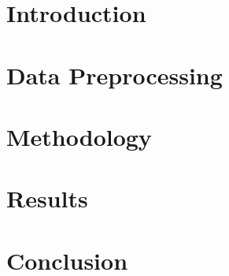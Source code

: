 \documentclass[NOTE, disdraft=false, UKenglish]{\DISCDTLATEXPATH UCLCDTDISdoc}
\begin{document}
\maketitle

\tableofcontents

\clearpage

\newpage
\section{Introduction}
\label{sec:introduction}


\section{Data Preprocessing}
\label{sec:data}


\section{Methodology}
\label{sec:methodology}


\section{Results}
\label{sec:results}


\section{Conclusion}
\label{sec:conclusion}

\end{document}
